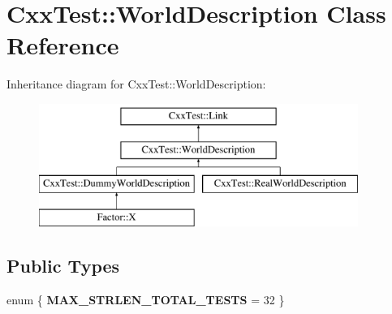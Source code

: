 \hypertarget{classCxxTest_1_1WorldDescription}{\section{Cxx\-Test\-:\-:World\-Description Class Reference}
\label{classCxxTest_1_1WorldDescription}
}
Inheritance diagram for Cxx\-Test\-:\-:World\-Description\-:\begin{figure}[H]
\begin{center}
\leavevmode
\includegraphics[height=4.000000cm]{classCxxTest_1_1WorldDescription}
\end{center}
\end{figure}
\subsection*{Public Types}
\begin{DoxyCompactItemize}
\item 
enum \{ {\bfseries M\-A\-X\-\_\-\-S\-T\-R\-L\-E\-N\-\_\-\-T\-O\-T\-A\-L\-\_\-\-T\-E\-S\-T\-S} = 32
 \}
\end{DoxyCompactItemize}
